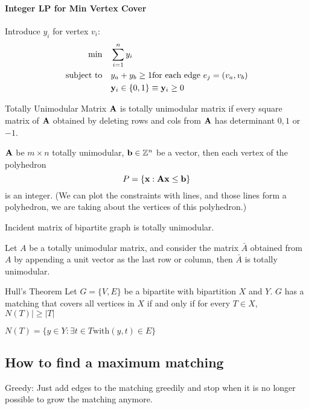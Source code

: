\paragraph{Integer LP for Min Vertex Cover}
Introduce $y_i$ for vertex $v_i$:
\begin{align*}
    \text{min} \quad &\sum_{i=1}^n y_i \\
    \text{subject to}\quad & y_a + y_b \geq 1 \text{for each edge $e_j =
    (v_a, v_b)$} \\
    & \mathbf{y}_i \in \{0, 1\} \equiv \mathbf{y}_i \geq 0
\end{align*}

\begin{definition}{Totally Unimodular Matrix} $\mathbf{A}$ is totally unimodular matrix
    if every square matrix of $\mathbf{A}$
    obtained by deleting rows and cols from $\mathbf{A}$ has determinant $0, 1$
    or $-1$.
\end{definition}

\begin{thm}
    $\mathbf{A}$ be $m\times n$ totally unimodular, $\mathbf{b} \in \mathbb{Z}^n$ be a
    vector, then each vertex of the polyhedron
    \[ P = \{ \mathbf{x}: \mathbf{A}\mathbf{x} \leq \mathbf{b}\} \]
    is an integer. (We can plot the constraints with lines, and those
    lines form a polyhedron, we are taking about the vertices of this
    polyhedron.)
\end{thm}

\begin{thm} 
    Incident matrix of bipartite graph is totally unimodular.
\end{thm}

\begin{lem}
    Let $A$ be a totally unimodular matrix, and consider the matrix
    $\bar{A}$ obtained from $A$ by appending a unit vector as the last row
    or column, then $\bar{A}$ is totally unimodular.
\end{lem}

\begin{thm}{Hull's Theorem}
    Let $G = \{V,E\}$ be a bipartite with bipartition $X$ and $Y$. $G$ has
    a matching that covers all vertices in $X$ if and only if for every
    $T \in X$, $N(T)| \geq |T|$

    $N(T) = \{ y \in Y: \exists t \in T \text{with} (y,t) \in E\}$
\end{thm}
\subsection{How to find a maximum matching}
Greedy: Just add edges to the matching greedily and stop when it is no
        longer possible to grow the matching anymore.

